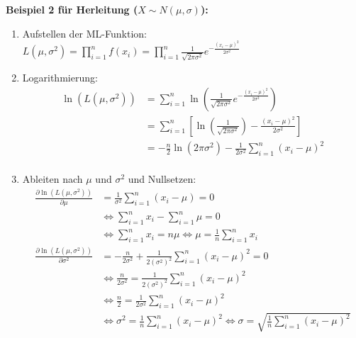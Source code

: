 \textbf{Beispiel 2 für Herleitung (\(X\sim N(\mu, \sigma)\)):}

\begin{enumerate}
    \item Aufstellen der ML-Funktion: \(L(\mu, \sigma^2)=\prod_{i=1}^{n}f(x_i)=\prod_{i=1}^{n}\frac{1}{\sqrt{2\pi\sigma^2}}e^{-\frac{(x_i-\mu)^2}{2\sigma^2}}\)
    \item Logarithmierung:\\
        \begin{equation*}
            \begin{split}
            \ln(L(\mu, \sigma^2))&=\sum_{i=1}^{n}\ln(\frac{1}{\sqrt{2\pi\sigma^2}}e^{-\frac{(x_i-\mu)^2}{2\sigma^2}})\\
            &=\sum_{i=1}^{n}\left [ \ln(\frac{1}{\sqrt{2\pi\sigma^2}})-\frac{(x_i-\mu)^2}{2\sigma^2}\right ]\\
            &=-\frac{n}{2}\ln(2\pi\sigma^2)-\frac{1}{2\sigma^2}\sum_{i=1}^{n}(x_i-\mu)^2\\
            \end{split}
        \end{equation*}
    \item Ableiten nach \(\mu\) und \(\sigma^2\) und Nullsetzen:
        \begin{equation*}
            \begin{split}
            \frac{\partial \ln(L(\mu, \sigma^2))}{\partial \mu}&=\frac{1}{\sigma^2}\sum_{i=1}^{n}(x_i-\mu)=0\\
            &\Leftrightarrow \sum_{i=1}^{n}x_i-\sum_{i=1}^{n}\mu=0\\
            &\Leftrightarrow \sum_{i=1}^{n}x_i=n\mu \Leftrightarrow \mu=\frac{1}{n}\sum_{i=1}^{n}x_i\\
            \frac{\partial \ln(L(\mu, \sigma^2))}{\partial \sigma^2}&=-\frac{n}{2\sigma^2}+\frac{1}{2(\sigma^2)^2}\sum_{i=1}^{n}(x_i-\mu)^2=0\\
            &\Leftrightarrow \frac{n}{2\sigma^2}=\frac{1}{2(\sigma^2)^2}\sum_{i=1}^{n}(x_i-\mu)^2\\
            &\Leftrightarrow \frac{n}{2}=\frac{1}{2\sigma^2}\sum_{i=1}^{n}(x_i-\mu)^2\\
            &\Leftrightarrow \sigma^2=\frac{1}{n}\sum_{i=1}^{n}(x_i-\mu)^2 \Leftrightarrow \sigma=\sqrt{\frac{1}{n}\sum_{i=1}^{n}(x_i-\mu)^2}\\
            \end{split}
        \end{equation*}
\end{enumerate}
